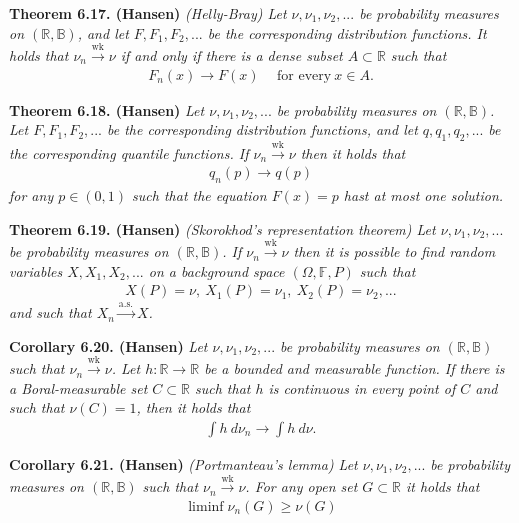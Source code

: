 \documentclass[a4paper,12pt,openany]{book}
\begin{document}
\textbf{Theorem 6.17. (Hansen)} \emph{(Helly-Bray) Let \(\nu,\nu_1,\nu_2,...\) be probability measures on \((\mathbb{R},\mathbb{B})\), and let \(F,F_1,F_2,...\) be the corresponding distribution functions. It holds that \(\nu_n\stackrel{\text{wk}}{\to}\nu\) if and only if there is a dense subset \(A\subset\mathbb{R}\) such that}
\begin{align*}
    F_n(x)\to F(x)\hspace{15pt}\text{for every}\ x\in A.\tag{6.16}
\end{align*}

\textbf{Theorem 6.18. (Hansen)} \emph{Let \(\nu,\nu_1,\nu_2,...\) be probability measures on \((\mathbb{R},\mathbb{B})\). Let \(F,F_1,F_2,...\) be the corresponding distribution functions, and let \(q,q_1,q_2,...\) be the corresponding quantile functions. If \(\nu_n\stackrel{\text{wk}}{\to}\nu\) then it holds that}
\begin{align*}
    q_n(p)\to q(p)
\end{align*}
\emph{for any \(p\in(0,1)\) such that the equation \(F(x)=p\) hast at most one solution.}

\textbf{Theorem 6.19. (Hansen)} \emph{(Skorokhod's representation theorem) Let \(\nu,\nu_1,\nu_2,...\) be probability measures on \((\mathbb{R},\mathbb{B})\). If \(\nu_n\stackrel{\text{wk}}{\to} \nu\) then it is possible to find random variables \(X,X_1,X_2,...\) on a background space \((\Omega,\mathbb{F},P)\) such that}
\begin{align*}
    X(P)=\nu,\ X_1(P)=\nu_1,\ X_2(P)=\nu_2, ...
\end{align*}
\emph{and such that \(X_n\stackrel{\text{a.s.}}{\to} X\).}

\textbf{Corollary 6.20. (Hansen)} \emph{Let \(\nu,\nu_1,\nu_2,...\) be probability measures on \((\mathbb{R},\mathbb{B})\) such that \(\nu_n\stackrel{\text{wk}}{\to}\nu\). Let \(h : \mathbb{R}\to\mathbb{R}\) be a bounded and measurable function. If there is a Boral-measurable set \(C\subset \mathbb{R}\) such that \(h\) is continuous in every point of \(C\) and such that \(\nu(C)=1\), then it holds that}
\begin{align*}
    \int h\ d\nu_n\to \int h\ d\nu.\tag{6.20}
\end{align*}

\textbf{Corollary 6.21. (Hansen)} \emph{(Portmanteau's lemma) Let \(\nu,\nu_1,\nu_2,...\) be probability measures on \((\mathbb{R},\mathbb{B})\) such that \(\nu_n\stackrel{\text{wk}}{\to}\nu\). For any open set \(G\subset \mathbb{R}\) it holds that}
\begin{align*}
    \liminf{\nu_n(G)}\ge \nu(G)\tag{6.21}
\end{align*}
\end{document}
